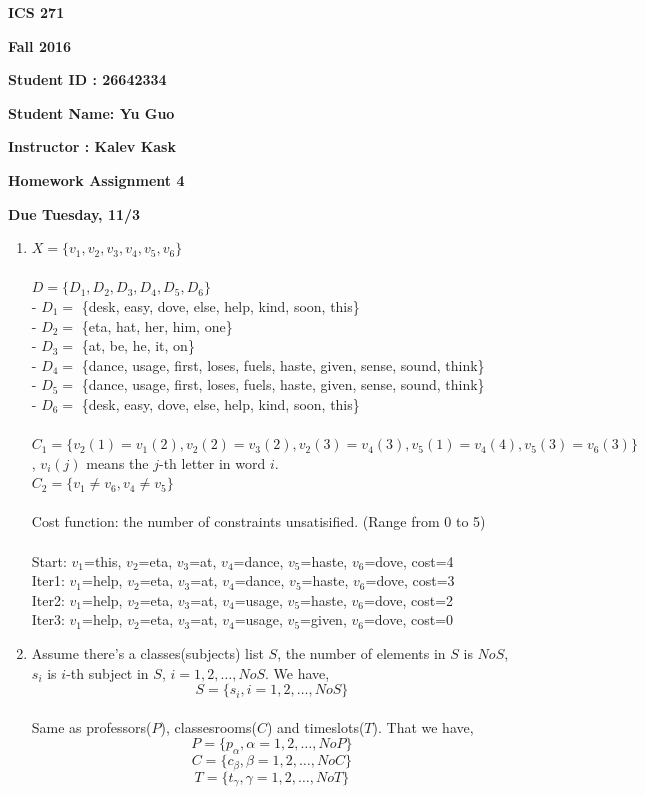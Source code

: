 \documentclass{article}
\begin{document}
{\bf ICS 271}

{\bf Fall 2016}

{\bf Student ID : 26642334}

{\bf Student Name: Yu Guo}

{\bf Instructor : Kalev Kask}

{\bf Homework Assignment 4}

{\bf Due Tuesday, 11/3}




\begin{enumerate}

\item

$X = \{v_1,v_2,v_3,v_4,v_5,v_6\}$ \\ \\
$D = \{D_1,D_2,D_3,D_4,D_5,D_6\}$ \\
- $D_1 = $ \{desk, easy, dove, else, help, kind, soon, this\} \\
- $D_2 = $ \{eta, hat, her, him, one\} \\
- $D_3 = $ \{at, be, he, it, on\} \\
- $D_4 = $ \{dance, usage, first, loses, fuels, haste, given, sense, sound, think\} \\
- $D_5 = $ \{dance, usage, first, loses, fuels, haste, given, sense, sound, think\} \\
- $D_6 = $ \{desk, easy, dove, else, help, kind, soon, this\} \\ \\
$C_1 = \{v_2(1)=v_1(2), v_2(2)=v_3(2), v_2(3)=v_4(3), v_5(1)=v_4(4), v_5(3)=v_6(3)\}$, $v_i(j)$ means the $j$-th letter in word $i$. \\
$C_2 = \{v_1 \neq v_6, v_4 \neq v_5\}$ \\ \\
Cost function: the number of constraints unsatisified. (Range from 0 to 5) \\ \\
Start: $v_1$=this, $v_2$=eta, $v_3$=at, $v_4$=dance, $v_5$=haste, $v_6$=dove, cost=4\\
Iter1: $v_1$=help, $v_2$=eta, $v_3$=at, $v_4$=dance, $v_5$=haste, $v_6$=dove, cost=3\\
Iter2: $v_1$=help, $v_2$=eta, $v_3$=at, $v_4$=usage, $v_5$=haste, $v_6$=dove, cost=2\\
Iter3: $v_1$=help, $v_2$=eta, $v_3$=at, $v_4$=usage, $v_5$=given, $v_6$=dove, cost=0\\


\item
Assume there's a classes(subjects) list $S$, the number of elements in $S$ is $NoS$, $s_i$ is $i$-th subject in $S$, $i=1,2,\dots,NoS$. We have, \\
$$ S = \{s_i, i=1,2,\dots,NoS\} $$ \\
Same as professors($P$), classesrooms($C$) and timeslots($T$). That we have,
$$ P = \{p_\alpha, \alpha=1,2,\dots,NoP\} $$ 
$$ C = \{c_\beta, \beta=1,2,\dots,NoC\} $$ 
$$ T = \{t_\gamma, \gamma=1,2,\dots,NoT\} $$ 


\end{enumerate}
\end{document}
